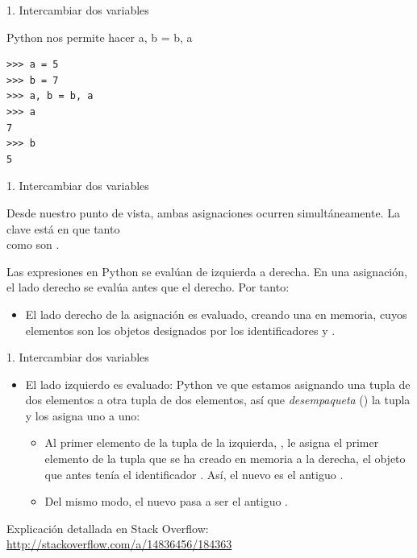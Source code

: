\documentclass[14pt]{beamer}
\begin{document}
\begin{frame}[fragile]{1. Intercambiar dos variables}
  \begin{block}{Python nos permite hacer}
    \centering \LARGE a, b = b, a
  \end{block}

  \begin{exampleblock}{}
    \begin{lstlisting}
>>> a = 5
>>> b = 7
>>> a, b = b, a
>>> a
7
>>> b
5
    \end{lstlisting}
  \end{exampleblock}
\end{frame}

\begin{frame}{1. Intercambiar dos variables}
  \begin{alertblock}{}
    \centering Desde nuestro punto de vista, ambas asignaciones
    ocurren simultáneamente. La clave está en que tanto \\
     como  son .
  \end{alertblock}

  Las expresiones en Python se evalúan de izquierda a derecha. En una
  asignación, el lado derecho se evalúa antes que el derecho. Por tanto:

  \begin{itemize}
    \item El lado derecho de la asignación es evaluado, creando una
       en memoria, cuyos elementos
      son los objetos designados por los identificadores 
      y .
  \end{itemize}
\end{frame}

\begin{frame}{1. Intercambiar dos variables}
  \begin{itemize}
    \item El lado izquierdo es evaluado: Python ve que estamos
      asignando una tupla de dos elementos a otra tupla de dos
      elementos, así que \emph{desempaqueta} () la tupla y los asigna uno a uno:
      \begin{itemize}
        \item Al primer elemento de la tupla de la izquierda,
          , le asigna el primer elemento de la tupla que
          se ha creado en memoria a la derecha, el objeto que antes
          tenía el identificador . Así, el nuevo
           es el antiguo .
        \item Del mismo modo, el nuevo  pasa a ser el
          antiguo .
      \end{itemize}
  \end{itemize}

  \small
  \begin{block}{Explicación detallada en Stack Overflow:}
    \centering \url{http://stackoverflow.com/a/14836456/184363}
  \end{block}
\end{frame}
\end{document}
